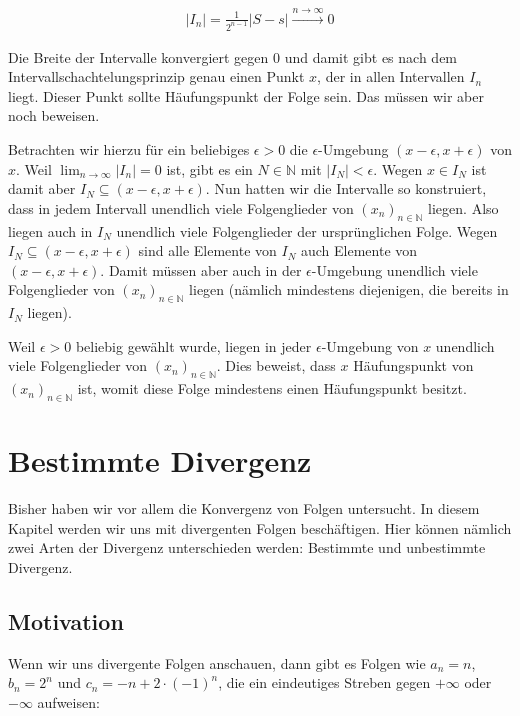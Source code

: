 \documentclass[fontsize=9pt,
               parskip=half-,
               DIV=14,
               listof=chapterentry,
               tocflat]{scrbook}
\begin{document}
\begin{proof*}
\begin{align*}
|I_{n}|={\frac {1}{2^{n-1}}}|S-s|{\xrightarrow {n\to \infty }}0
\end{align*}

Die Breite der Intervalle konvergiert gegen $0$ und damit gibt es nach dem Intervallschachtelungsprinzip genau einen Punkt $x$, der in allen Intervallen $I_{n}$ liegt. Dieser Punkt sollte Häufungspunkt der Folge sein. Das müssen wir aber noch beweisen.

Betrachten wir hierzu für ein beliebiges $\epsilon >0$ die $\epsilon $-Umgebung $(x-\epsilon ,x+\epsilon )$ von $x$. Weil $\lim _{n\to \infty }|I_{n}|=0$ ist, gibt es ein $N\in \mathbb {N} $ mit $|I_{N}|<\epsilon $. Wegen $x\in I_{N}$ ist damit aber $I_{N}\subseteq (x-\epsilon ,x+\epsilon )$. Nun hatten wir die Intervalle so konstruiert, dass in jedem Intervall unendlich viele Folgenglieder von $(x_{n})_{n\in \mathbb {N} }$ liegen. Also liegen auch in $I_{N}$ unendlich viele Folgenglieder der ursprünglichen Folge. Wegen $I_{N}\subseteq (x-\epsilon ,x+\epsilon )$ sind alle Elemente von $I_{N}$ auch Elemente von $(x-\epsilon ,x+\epsilon )$. Damit müssen aber auch in der $\epsilon $-Umgebung unendlich viele Folgenglieder von $(x_{n})_{n\in \mathbb {N} }$ liegen (nämlich mindestens diejenigen, die bereits in $I_{N}$ liegen).

Weil $\epsilon >0$ beliebig gewählt wurde, liegen in jeder $\epsilon $-Umgebung von $x$ unendlich viele Folgenglieder von $(x_{n})_{n\in \mathbb {N} }$. Dies beweist, dass $x$ Häufungspunkt von $(x_{n})_{n\in \mathbb {N} }$ ist, womit diese Folge mindestens einen Häufungspunkt besitzt.

\end{proof*}

\chapter{Bestimmte Divergenz}

Bisher haben wir vor allem die Konvergenz von Folgen untersucht. In diesem Kapitel werden wir uns mit divergenten Folgen beschäftigen. Hier können nämlich zwei Arten der Divergenz unterschieden werden: Bestimmte und unbestimmte Divergenz.

\section{Motivation}

Wenn wir uns divergente Folgen anschauen, dann gibt es Folgen wie $a_{n}=n$, $b_{n}=2^{n}$ und $c_{n}=-n+2\cdot (-1)^{n}$, die ein eindeutiges Streben gegen $+\infty $ oder $-\infty $ aufweisen:
\end{document}
